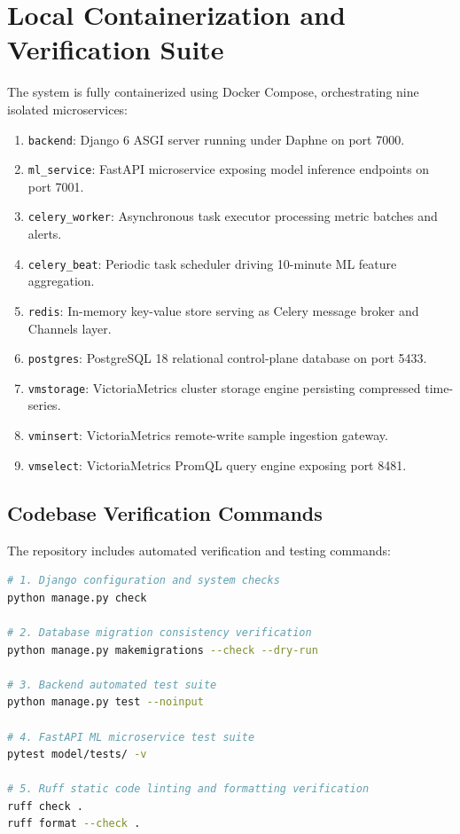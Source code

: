 \section{Local Containerization and Verification Suite}
The system is fully containerized using Docker Compose, orchestrating nine isolated microservices:
\begin{enumerate}
  \item \texttt{backend}: Django 6 ASGI server running under Daphne on port 7000.
  \item \texttt{ml\_service}: FastAPI microservice exposing model inference endpoints on port 7001.
  \item \texttt{celery\_worker}: Asynchronous task executor processing metric batches and alerts.
  \item \texttt{celery\_beat}: Periodic task scheduler driving 10-minute ML feature aggregation.
  \item \texttt{redis}: In-memory key-value store serving as Celery message broker and Channels layer.
  \item \texttt{postgres}: PostgreSQL 18 relational control-plane database on port 5433.
  \item \texttt{vmstorage}: VictoriaMetrics cluster storage engine persisting compressed time-series.
  \item \texttt{vminsert}: VictoriaMetrics remote-write sample ingestion gateway.
  \item \texttt{vmselect}: VictoriaMetrics PromQL query engine exposing port 8481.
\end{enumerate}

\subsection{Codebase Verification Commands}
The repository includes automated verification and testing commands:
\begin{lstlisting}[language=bash,caption={System verification and quality assurance commands}]
# 1. Django configuration and system checks
python manage.py check

# 2. Database migration consistency verification
python manage.py makemigrations --check --dry-run

# 3. Backend automated test suite
python manage.py test --noinput

# 4. FastAPI ML microservice test suite
pytest model/tests/ -v

# 5. Ruff static code linting and formatting verification
ruff check .
ruff format --check .
\end{lstlisting}
